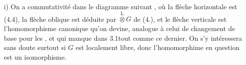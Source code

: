 i) On a commutativité dans le diagramme suivant
,
où la flèche horizontale est (4.4), la flèche oblique est déduite par $\overset{\underline{\mathrm{L}}}{\otimes}G$ de (4.), et le flèche verticale est l'homomorphisme canonique qu'on devine, analogue à celui de changement de base pour les \handwritten{\textsuperscript{$!$}}, et qui manque dans 3.1\handwritten{(}tout comme ce dernier\handwritten{)}. On s'y intéressera sans doute surtout si $G$ est localement libre, donc l'homomorphime en question est un isomorphisme.
